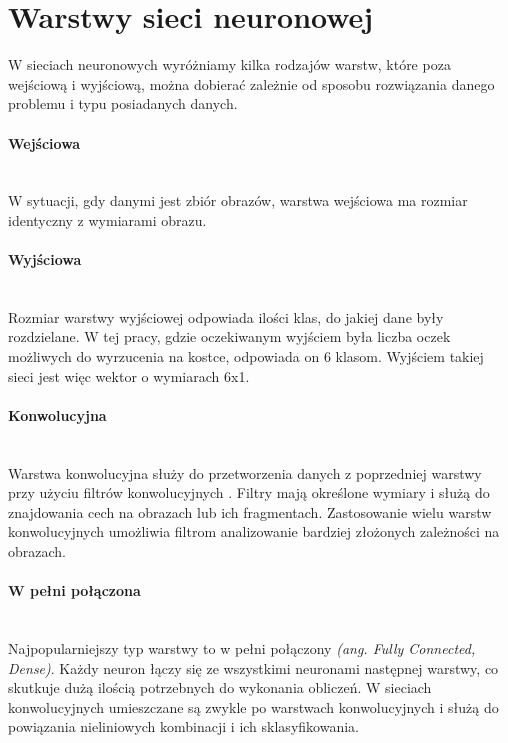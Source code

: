 \section{Warstwy sieci neuronowej}

W sieciach neuronowych wyróżniamy kilka rodzajów warstw, które poza wejściową i wyjściową,
można dobierać zależnie od sposobu rozwiązania danego problemu i typu posiadanych danych.

\paragraph{Wejściowa} \mbox{}\\
W sytuacji, gdy danymi jest zbiór obrazów, warstwa wejściowa ma rozmiar identyczny z
wymiarami obrazu.

\paragraph{Wyjściowa} \mbox{}\\
Rozmiar warstwy wyjściowej odpowiada ilości klas, do jakiej dane były rozdzielane.
W tej pracy, gdzie oczekiwanym wyjściem była liczba oczek możliwych do wyrzucenia na
kostce, odpowiada on 6 klasom. Wyjściem takiej sieci jest więc wektor o wymiarach 6x1.

\paragraph{Konwolucyjna} \mbox{}\\
Warstwa konwolucyjna służy do przetworzenia danych z poprzedniej warstwy przy użyciu
filtrów konwolucyjnych \cite{CS231n}. Filtry mają określone wymiary i służą do znajdowania cech
na obrazach lub ich fragmentach. Zastosowanie wielu warstw konwolucyjnych umożliwia filtrom
analizowanie bardziej złożonych zależności na obrazach.

\paragraph{W pełni połączona} \mbox{}\\
Najpopularniejszy typ warstwy to w pełni połączony \textit{(ang. Fully Connected, Dense)}.
Każdy neuron łączy się ze wszystkimi neuronami następnej warstwy, co skutkuje dużą ilością
potrzebnych do wykonania obliczeń.
W sieciach konwolucyjnych umieszczane są zwykle po warstwach konwolucyjnych
i służą do powiązania nieliniowych kombinacji i ich sklasyfikowania.

